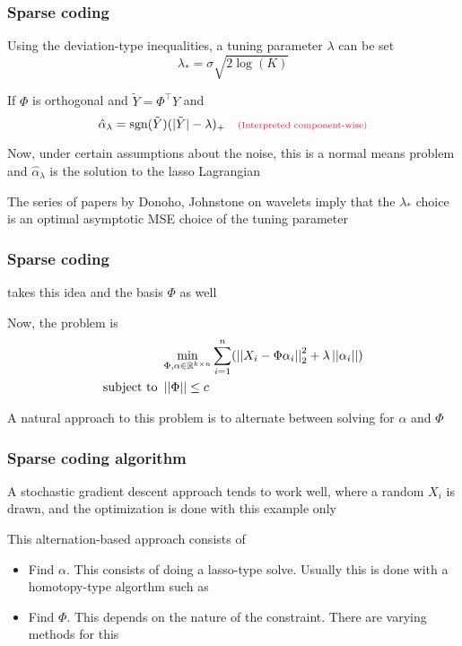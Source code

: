 \documentclass[12pt]{beamer}
\newcommand{\parenthetical}[2]{#1  \scriptstyle \alr{( #2)}}
\begin{document}
\begin{frame}[fragile]
\frametitle{Sparse coding}
Using the deviation-type inequalities, a tuning parameter $\lambda$ can be set
\[
\lambda_* = \sigma\sqrt{2\log(K)}
\]
\vsp 

 If $\Phi$ is orthogonal and $\tilde{Y} = \Phi^{\top}Y$ and
\[
\hat{\alpha}_\lambda = \textrm{sgn}(\tilde{Y})(|\tilde{Y}| - \lambda)_+ \parenthetical{\quad}{\textrm{Interpreted component-wise}}
\]

Now, under certain assumptions about the noise, this is a normal means problem and $\hat{\alpha}_\lambda$
is the solution to the lasso Lagrangian

\vsp
The series of papers by Donoho, Johnstone on wavelets  imply that the $\lambda_*$ choice is an optimal asymptotic MSE
choice of the tuning parameter

\end{frame}

\begin{frame}[fragile]
\frametitle{Sparse coding}
 takes this idea and  the basis $\Phi$ as well

\vsp
Now, the problem is
\begin{align*}
& \min_{\Phi,\alpha\in\mathbb{R}^{k \times n}} \sum_{i=1}^n(\left|\left| X_i - \Phi\alpha_i \right|\right|_2^2 + \lambda\left|\left| \alpha_i \right|\right|)\\
\textrm{subject to } & \left|\left| \Phi \right|\right| \leq c
\end{align*}

A natural approach to this problem is to alternate between solving for $\alpha$ and $\Phi$

\end{frame}

\begin{frame}[fragile]
\frametitle{Sparse coding algorithm}
A stochastic gradient descent approach tends to work well, where a random $X_i$ is drawn,
and the optimization is done with this example only

\vsp
This alternation-based approach consists of
\begin{itemize}
\item {} Find $\alpha$.  This consists of doing a lasso-type solve.  Usually this is done 
with a homotopy-type algorthm such as 
\item {} Find $\Phi$. This depends on the nature of the constraint.  There are varying methods
for this

\end{itemize}
\end{frame}
\end{document}

